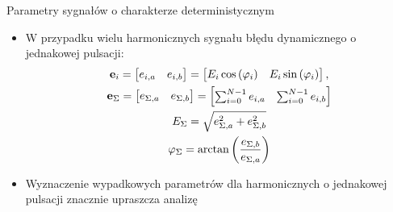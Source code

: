 \documentclass[12pt, polish, aspectratio = 169]{beamer}
\begin{document}
\begin{frame}{Parametry sygnałów o charakterze deterministycznym}
\begin{itemize}
\item W przypadku wielu harmonicznych sygnału błędu dynamicznego o jednakowej pulsacji:
\begin{gather}
\mathbf{e}_{i} =
\begin{bmatrix}
e_{i,a} & e_{i,b}
\end{bmatrix}
=
\begin{bmatrix}
E_{i} \cos \left(\varphi_{i}\right) & E_{i} \sin \left(\varphi_{i}\right)
\end{bmatrix}
\label{eq:dyn_vect}, \\
\mathbf{e}_{\Sigma} =
\begin{bmatrix}
e_{\Sigma,a} & e_{\Sigma,b}
\end{bmatrix}
=
\begin{bmatrix}
\sum _{i = 0} ^{N-1} e_{i,a} & \sum _{i = 0} ^{N-1} e_{i,b}
\end{bmatrix}
\label{eq:dyn_vect_sum} \\
E_{\Sigma} = \sqrt{e_{\Sigma,a}^{2} + e_{\Sigma,b}^{2}} \label{eq:dyn_vect_amp} \\
\varphi_{\Sigma} = \arctan \left(\frac{e_{\Sigma,b}}{e_{\Sigma,a}}\right) \label{eq:dyn_vect_phi}
\end{gather}
\item Wyznaczenie wypadkowych parametrów dla harmonicznych o jednakowej pulsacji znacznie upraszcza analizę
\end{itemize}
\end{frame}
\end{document}
